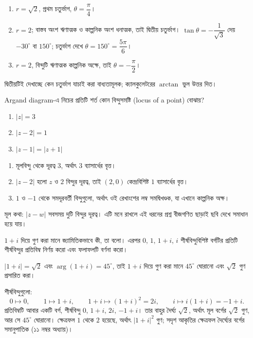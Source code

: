 \documentclass[11pt]{article}
\begin{document}
\begin{sol}
\begin{enumerate}
  \item $r = \sqrt{2}$, প্রথম চতুর্ভাগ, $\theta = \dfrac{\pi}{4}$।
  \item $r = 2$; বাস্তব অংশ ঋণাত্মক ও কাল্পনিক অংশ ধনাত্মক, তাই দ্বিতীয়
        চতুর্ভাগ। $\tan\theta = -\dfrac{1}{\sqrt{3}}$ দেয় $-30^{\circ}$
        বা $150^{\circ}$; চতুর্ভাগ দেখে $\theta = 150^{\circ} =
        \dfrac{5\pi}{6}$।
  \item $r = 2$, বিন্দুটি ঋণাত্মক কাল্পনিক অক্ষে, তাই
        $\theta = -\dfrac{\pi}{2}$।
\end{enumerate}
দ্বিতীয়টিই দেখাচ্ছে কেন চতুর্ভাগ যাচাই করা বাধ্যতামূলক; ক্যালকুলেটরের
$\arctan$ ভুল উত্তর দিত।
\end{sol}

 Argand diagram-এ নিচের প্রতিটি শর্ত কোন বিন্দুসমষ্টি (locus of a point) বোঝায়?
\begin{enumerate}
  \item $|z| = 3$
  \item $|z-2| = 1$
  \item $|z-1| = |z+1|$
\end{enumerate}

\begin{sol}
\begin{enumerate}
  \item মূলবিন্দু থেকে দূরত্ব $3$, অর্থাৎ $3$ ব্যাসার্ধের বৃত্ত।
  \item $|z-2|$ হলো $z$ ও $2$ বিন্দুর দূরত্ব, তাই $(2,0)$ কেন্দ্রবিশিষ্ট
        $1$ ব্যাসার্ধের বৃত্ত।
  \item $1$ ও $-1$ থেকে সমদূরবর্তী বিন্দুগুলো, অর্থাৎ ওই রেখাংশের লম্ব
        সমদ্বিখণ্ডক, যা এখানে কাল্পনিক অক্ষ।
\end{enumerate}
মূল কথা: $|z-w|$ সবসময় দুটি বিন্দুর দূরত্ব। এটি মনে রাখলে এই ধরনের প্রশ্ন
বীজগণিত ছাড়াই ছবি দেখে সমাধান হয়ে যায়।
\end{sol}

 $1+i$ দিয়ে গুণ করা মানে জ্যামিতিকভাবে কী, তা বলো। এরপর $0$, $1$,
$1+i$, $i$ শীর্ষবিন্দুবিশিষ্ট বর্গটির প্রতিটি শীর্ষবিন্দুর প্রতিবিম্ব নির্ণয়
করো এবং ফলাফলটি বর্ণনা করো।

\begin{sol}
$|1+i| = \sqrt{2}$ এবং $\arg(1+i) = 45^{\circ}$, তাই $1+i$ দিয়ে গুণ করা মানে
$45^{\circ}$ ঘোরানো এবং $\sqrt{2}$ গুণ প্রসারিত করা।

শীর্ষবিন্দুগুলো:
\[
  0 \mapsto 0, \qquad
  1 \mapsto 1+i, \qquad
  1+i \mapsto (1+i)^{2} = 2i, \qquad
  i \mapsto i(1+i) = -1+i .
\]
প্রতিবিম্বটি আবার একটি বর্গ, শীর্ষবিন্দু $0$, $1+i$, $2i$, $-1+i$। তার বাহুর
দৈর্ঘ্য $\sqrt{2}$, অর্থাৎ মূল বর্গের $\sqrt{2}$ গুণ, আর সে $45^{\circ}$
ঘোরানো। ক্ষেত্রফল $1$ থেকে $2$ হয়েছে, অর্থাৎ $|1+i|^{2}$ গুণ; সদৃশ আকৃতির
ক্ষেত্রফল দৈর্ঘ্যের বর্গের সমানুপাতিক (১১ নম্বর অধ্যায়)।
\end{sol}
\end{document}
